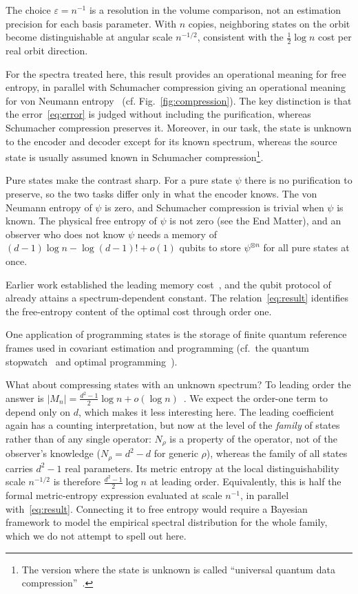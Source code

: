 \documentclass[aps,prl,twocolumn,superscriptaddress,amsmath,amssymb,reprint,longbibliography]{revtex4-2}
\def\eps{\varepsilon}
\begin{document}
The choice $\eps=n^{-1}$ is a resolution in the volume comparison, not an estimation precision for each basis parameter. With $n$ copies, neighboring states on the orbit become distinguishable at angular scale $n^{-1/2}$, consistent with the $\frac12\log n$ cost per real orbit direction.

For the spectra treated here, this result provides an operational meaning for free entropy, in parallel with Schumacher compression giving an operational meaning for von Neumann entropy~\cite{schumacher1995quantum} (cf. Fig.~\ref{fig:compression}). The key distinction is that the error~\eqref{eq:error} is judged without including the purification, whereas Schumacher compression preserves it. Moreover, in our task, the state is unknown to the encoder and decoder except for its known spectrum, whereas the source state is usually assumed known in Schumacher compression\footnote{The version where the state is unknown is called ``universal quantum data compression''~\cite{jozsa1998universal,hayashi2002quantum,hayashi2002simple,hayashi2010universal}.}. 

Pure states make the contrast sharp. For a pure state $\psi$ there is no purification to preserve, so the two tasks differ only in what the encoder knows. The von Neumann entropy of $\psi$ is zero, and Schumacher compression is trivial when $\psi$ is known. The physical free entropy of $\psi$ is not zero (see the End Matter), and an observer who does not know $\psi$ needs a memory of $(d-1)\log n-\log(d-1)!+o(1)$ qubits to store $\psi^{\otimes n}$ for all pure states at once.




Earlier work established the leading memory cost~\cite{yang2016optimal,yang2018compression}, and the qubit protocol of~\cite{yang2016optimal} already attains a spectrum-dependent constant. The relation~\eqref{eq:result} identifies the free-entropy content of the optimal cost through order one.

One application of programming states is the storage of finite quantum reference frames used in covariant estimation and programming (cf.\ the quantum stopwatch~\cite{yang2018quantum} and optimal programming~\cite{yang2020optimal,Kubicki_2019}). 
 
What about compressing states with an unknown spectrum? To leading order the answer is $|M_n| = \frac{d^2-1}{2}\log n+o(\log n)$~\cite{yang2016optimal,yang2018compression}. We expect the order-one term to depend only on $d$, which makes it less interesting here. The leading coefficient again has a counting interpretation, but now at the level of the \emph{family} of states rather than of any single operator: $N_\rho$ is a property of the operator, not of the observer's knowledge ($N_\rho=d^2-d$ for generic $\rho$), whereas the family of all states carries $d^2-1$ real parameters. Its metric entropy at the local distinguishability scale $n^{-1/2}$ is therefore $\frac{d^2-1}{2}\log n$ at leading order. Equivalently, this is half the formal metric-entropy expression evaluated at scale $n^{-1}$, in parallel with~\eqref{eq:result}. Connecting it to free entropy would require a Bayesian framework to model the empirical spectral distribution for the whole family, which we do not attempt to spell out here.
\end{document}
